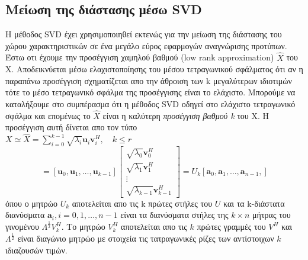 \subsection{Μείωση της διάστασης μέσω \textlatin{SVD}}
\par
Η μέθοδος \textlatin{SVD} έχει χρησιμοποιηθεί εκτενώς για την μείωση της διάστασης του χώρου χαρακτηριστικών σε ένα μεγάλο εύρος εφαρμογών αναγνώρισης προτύπων. Έστω οτι έχουμε την προσέγγιση χαμηλού βαθμού \textlatin{(low rank approximation)} $ \hat{X} $ του \textlatin{X}. Αποδεικνύεται μέσω ελαχιστοποίησης του μέσου τετραγωνικού σφάλματος ότι αν η παραπάνω προσέγγιση σχηματίζεται απο την άθροιση των \textlatin{k} μεγαλύτερων ιδιοτιμών τότε το μέσο τετραγωνικό σφάλμα της προσέγγισης είναι το ελάχιστο. Μπορούμε να καταλήξουμε στο συμπέρασμα ότι η μέθοδος \textlatin{SVD} οδηγεί στο ελάχιστο τετραγωνικό σφάλμα και επομένως το $ \hat{X} $ είναι η καλύτερη \textit{προσέγγιση βαθμού \textlatin{k}} του \textlatin{X}. Η προσέγγιση αυτή δίνεται απο τον τύπο \\
\newline\hspace*{\fill}
$ X \simeq \hat{X} = \sum_{i=0}^{k-1} \sqrt{\lambda_{i}} \mathbf{u}_{i}\mathbf{v}_{i}^{H},\quad k \leq r $
\hspace*{\fill}\newline
\newline\hspace*{\fill}
\begin{equation}
	= [\mathbf{u}_{0},\mathbf{u}_{1},\ldots,\mathbf{u}_{k-1}]
	\begin{bmatrix}
	\sqrt{\lambda_{0}}\mathbf{v}_{0}^{H} \\
	\sqrt{\lambda_{1}}\mathbf{v}_{1}^{H} \\
	\vdots \\ 
	\sqrt{\lambda_{k-1}}\mathbf{v}_{k-1}^{H}
	\end{bmatrix} 
	= U_{k}[\mathbf{a}_{0},\mathbf{a}_{1},\ldots,\mathbf{a}_{n-1},]
\end{equation}
\hspace*{\fill}\newline
όπου ο μητρώο $U_{k}$ αποτελείται απο τις \textlatin{k} πρώτες στήλες του $U$ και τα \textlatin{k}-διάστατα διανύσματα $\mathbf{a}_{i},i=0,1,\ldots,n-1$ είναι τα διανύσματα στήλες της $k \times n$ μήτρας του γινομένου $ \Lambda^{\frac{1}{2}}V_{k}^{H}$. Το μητρώο $V_{k}^{H}$ αποτελείται απο τις $k$ πρώτες γραμμές του $V^{H}$ και $ \Lambda^{\frac{1}{2}} $ είναι διαγώνιο μητρώο με στοιχεία τις τατραγωνικές ρίζες των αντίστοιχων $k$ ιδιαζουσών τιμών.
